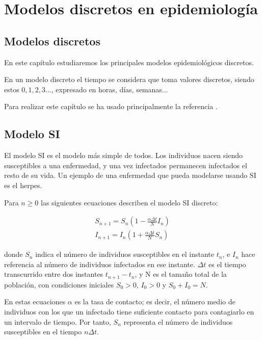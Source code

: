 \chapter{Modelos discretos en epidemiología}

\section{Modelos discretos}

En este capítulo estudiaremos los principales modelos epidemiológicos discretos.

En un modelo discreto el tiempo se considera que toma valores discretos, siendo estos $0,1,2,3...$, expresado en horas, días, semanas...

Para realizar este capítulo se ha usado principalmente la referencia \cite{allenDiscretetimeSISIR1994}.

\section{Modelo SI}
El modelo SI es el modelo más simple de todos. Los individuos nacen siendo susceptibles a una enfermedad, y una vez infectados permanecen infectados el resto de su vida.
Un ejemplo de una enfermedad que pueda modelarse usando SI es el herpes.

Para $n\geq 0$ las siguientes ecuaciones describen el modelo SI discreto:

\begin{equation}
\label{eqn: SI}
\begin{aligned}
S_{n+1}=S_n\left( 1-\frac{\alpha\Delta t}{N}I_n\right) \\
I_{n+1}=I_n\left( 1+\frac{\alpha\Delta t}{N}S_n\right)
\end{aligned}
\end{equation}

donde $S_n$ indica el número de individuos susceptibles en el instante $t_n$, e $I_n$ hace referencia al número de individuos infectados en ese instante. $\Delta t$ es el tiempo transcurrido entre dos instantes $t_{n+1}-t_n$, y N es el tamaño total de la población, con condiciones iniciales $S_0>0$, $I_0>0$ y $S_0+I_0=N$.

En estas ecuaciones $\alpha$ es la tasa de contacto; es decir, el número medio de individuos con los que un infectado tiene suficiente contacto para contagiarlo en un intervalo de tiempo. Por tanto, $S_n$ representa el número de individuos susceptibles en el tiempo $n\Delta t$.


